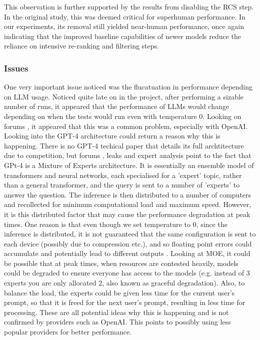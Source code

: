 This observation is further supported by the results from disabling the RCS step. In the original study, this was deemed critical for superhuman performance. In our experiments, its removal still yielded near-human performance, once again indicating that the improved baseline capabilities of newer models reduce the reliance on intensive re-ranking and filtering steps. \\

\subsubsection{Issues}
One very important issue noticed was the flucatuation in performance depending on LLM usage.
Noticed quite late on in the project, after performing a sizable number of runs, it appeared that the performance of LLMs would change depending on when the tests would run even with temperature 0. Looking on forums \cite{beconvincible_does_2023}, it appeared that this was a common problem, especially with OpenAI. Looking into the GPT-4 architecture could return a reason why this is happening. There is no GPT-4 techical paper that details its full archtitecture due to competition, but forums \cite{noauthor_mixture_nodate} \cite{gwern_gpt-4_2023}, leaks  and expert analysis \cite{soumith_chintala_soumithchintala_i_2023} \cite{swyx_swyx_latentspacepod_2023} \cite{betts_peering_2023} point to the fact that GPt-4 is a Mixture of Experts architecture. It is essentially an ensemble model of transformers and neural networks, each specialised for a 'expert' topic, rather than a general transformer, and the query is sent to a number of 'experts' to answer the question. The inference is then distributed to a number of computers and recollected for minimum computational load and maximum speed. However, it is this distributed factor that may cause the performance degradation at peak times. One reason is that even though we set temperature to 0, since the inference is distributed, it is not guaranteed that the same configuration is sent to each device (possibly due to compression etc.), and so floating point errors could accumulate and potentially lead to different outputs \cite{noauthor_non-determinism_2023}. Looking at MOE, it could be possible that at peak times, when resources are contested heavily, models could be degraded to ensure everyone has access to the models (e.g. instead of 3 experts you are only allocated 2, also known as graceful degradation). Also, to balance the load, the experts could be given less time for the current user's prompt, so that it is freed for the next user's prompt, resulting in less time for processing. These are all potential ideas why this is happening and is not confirmed by providers such as OpenAI. This points to possibly using less popular providers for better performance. \\

